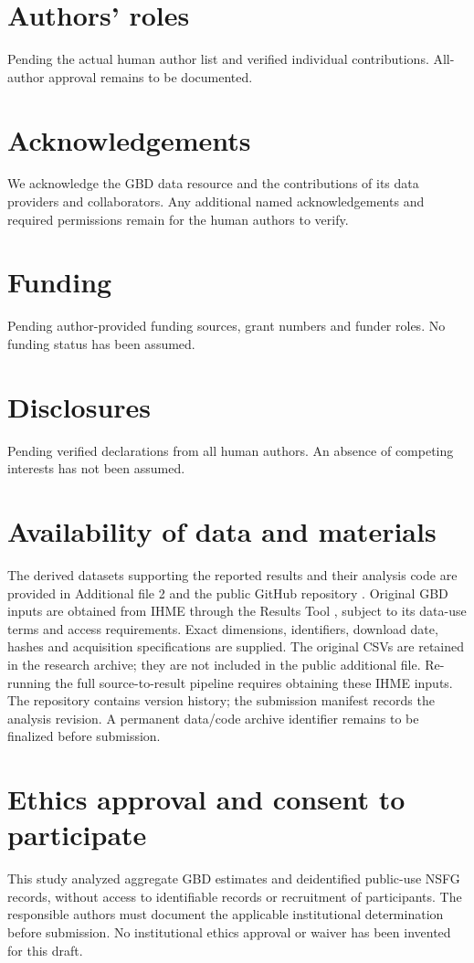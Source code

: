 \documentclass[11pt,a4paper]{article}
\begin{document}
\section*{Authors' roles}
Pending the actual human author list and verified individual contributions. All-author approval remains to be documented.

\section*{Acknowledgements}
We acknowledge the GBD data resource and the contributions of its data providers and collaborators. Any additional named acknowledgements and required permissions remain for the human authors to verify.


\section*{Funding}
Pending author-provided funding sources, grant numbers and funder roles. No funding status has been assumed.

\section*{Disclosures}
Pending verified declarations from all human authors. An absence of competing interests has not been assumed.

\section*{Availability of data and materials}
The derived datasets supporting the reported results and their analysis code are provided in Additional file 2 and the public GitHub repository \cite{repository}. Original GBD inputs are obtained from IHME through the Results Tool \cite{results}, subject to its data-use terms and access requirements. Exact dimensions, identifiers, download date, hashes and acquisition specifications are supplied. The original CSVs are retained in the research archive; they are not included in the public additional file. Re-running the full source-to-result pipeline requires obtaining these IHME inputs. The repository contains version history; the submission manifest records the analysis revision. A permanent data/code archive identifier remains to be finalized before submission.

\section*{Ethics approval and consent to participate}
This study analyzed aggregate GBD estimates and deidentified public-use NSFG records, without access to identifiable records or recruitment of participants. The responsible authors must document the applicable institutional determination before submission. No institutional ethics approval or waiver has been invented for this draft.
\end{document}
